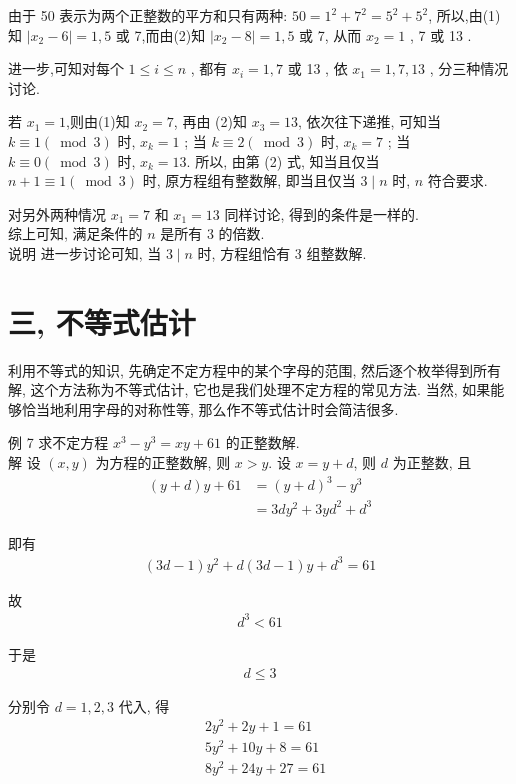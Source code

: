 	由于 50 表示为两个正整数的平方和只有两种: $50=1^{2}+7^{2}=5^{2}+5^{2}$, 所以,由(1)知 $\left|x_{2}-6\right|=1 ,  5$ 或 7,而由(2)知 $\left|x_{2}-8\right|=1 ,  5$ 或 7, 从而 $x_{2}=1$ ,  7 或 13 .

	进一步,可知对每个 $1 \leqslant i \leqslant n$ , 都有 $x_{i}=1,7$ 或 13 , 依 $x_{1}=1 ,  7 ,  13$ , 分三种情况讨论.

	若 $x_{1}=1$,则由(1)知 $x_{2}=7$, 再由 (2)知 $x_{3}=13$, 依次往下递推, 可知当 $k \equiv 1(\bmod 3)$ 时,  $x_{k}=1$ ; 当 $k \equiv 2(\bmod 3)$ 时,  $x_{k}=7$ ; 当 $k \equiv 0(\bmod 3)$ 时,  $x_{k}=13$. 所以, 由第 (2) 式, 知当且仅当 $n+1 \equiv 1(\bmod 3)$ 时, 原方程组有整数解, 即当且仅当 $3 \mid n$ 时, $n$ 符合要求.

	对另外两种情况 $x_{1}=7$ 和 $x_{1}=13$ 同样讨论, 得到的条件是一样的.\\
	综上可知, 满足条件的 $n$ 是所有 3 的倍数. \\
	说明 进一步讨论可知, 当 $3 \mid n$ 时, 方程组恰有 3 组整数解.

	\section{三, 不等式估计}
	利用不等式的知识, 先确定不定方程中的某个字母的范围, 然后逐个枚举得到所有解, 这个方法称为不等式估计, 它也是我们处理不定方程的常见方法. 当然, 如果能够恰当地利用字母的对称性等, 那么作不等式估计时会简洁很多.

	例 7 求不定方程 $x^{3}-y^{3}=x y+61$ 的正整数解.\\
	解 设 $(x, y)$ 为方程的正整数解, 则 $x>y$. 设 $x=y+d$, 则 $d$ 为正整数, 且\begin{align}
		(y+d) y+61 & =(y+d)^{3}-y^{3}           \\
		           & =3 d y^{2}+3 y d^{2}+d^{3}
	\end{align}

	即有
\begin{align*}
		(3 d-1) y^{2}+d(3 d-1) y+d^{3}=61
	\end{align*}

	故
\begin{align*}
		d^{3}<61
	\end{align*}

	于是
\begin{align*}
		d \leqslant 3
	\end{align*}

	分别令 $d=1 ,  2 ,  3$ 代入, 得\begin{align}
		 & 2 y^{2}+2 y+1=61   \\
		 & 5 y^{2}+10 y+8=61  \\
		 & 8 y^{2}+24 y+27=61
	\end{align}

